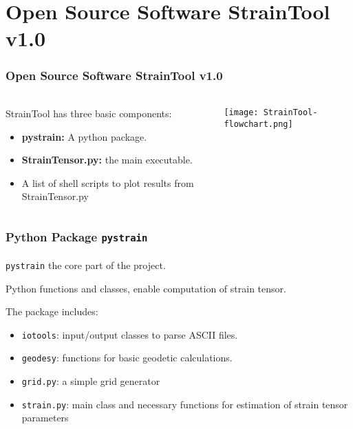 \section{Open Source Software \textbf{StrainTool v1.0}}
 
\graphicspath{{Chapter2/Figs/}}

\begin{frame}
  \frametitle{Open Source Software \textbf{StrainTool v1.0}}
  \framesubtitle{}
  \label{ch2:straintool}
  
  \begin{columns}
    \begin{column}{0.5\textwidth}
      StrainTool has three basic components:
      \begin{itemize}
        \item \textbf{pystrain:} A python package.
        \item \textbf{StrainTensor.py:} the main executable.
        \item A list of shell scripts to plot results from StrainTensor.py
      \end{itemize}
    \end{column}
    \begin{column}{0.5\textwidth}
      \texttt{[image: StrainTool-flowchart.png]} 
    \end{column}
  \end{columns}
\end{frame}
\note{}


\begin{frame}
  \frametitle{Python Package \texttt{pystrain}}
  \framesubtitle{}
  \label{ch2:}
  
  \texttt{pystrain} the core part of the project.
  
  Python functions and classes, enable computation of strain tensor.
  
  The package includes:
  \begin{itemize}
    \item \texttt{iotools}: input/output classes to parse ASCII files.
    \item \texttt{geodesy}: functions for basic geodetic calculations.
    \item \texttt{grid.py}: a simple grid generator
    \item \texttt{strain.py}: main class and necessary functions for estimation of strain  tensor parameters
  \end{itemize}
  
  

\end{frame}
\note{}


